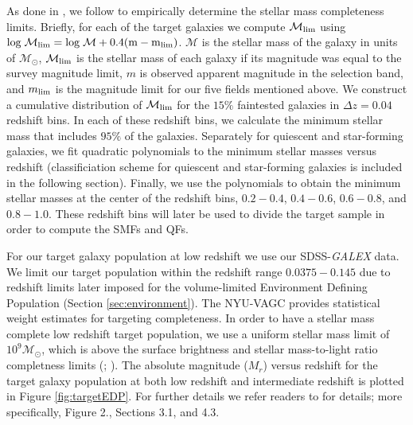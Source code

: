 \documentclass{emulateapj}
\begin{document}
As done in \cite{Moustakas:2013aa}, we follow \cite{Pozzetti:2010aa} to empirically determine the stellar mass completeness limits.
Briefly, for each of the target galaxies we compute $\mathcal{M}_{\rm{lim}}$ using $\rm{log} \; \mathcal{M}_{\rm{lim}} = \rm{log} \; \mathcal{M} + 0.4 ( m - m_{\rm{lim}})$.
$\mathcal{M}$ is the stellar mass of the galaxy in units of $\mathcal{M_{\odot}}$, $\mathcal{M}_{\rm{lim}}$ is the stellar mass of each galaxy if its magnitude was 
equal to the survey magnitude limit, $m$ is observed apparent magnitude in the selection band, and $m_{\rm{lim}}$ is the magnitude limit for our five fields mentioned above.
We construct a cumulative distribution of $\mathcal{M}_{\rm{lim}}$ for the $15\%$ faintested galaxies in $\Delta z=0.04$ redshift bins.
In each of these redshift bins, we calculate the minimum stellar mass that includes $95 \%$ of the galaxies.
Separately for quiescent and star-forming galaxies, we fit quadratic polynomials to the minimum stellar masses versus redshift (classificiation scheme for quiescent 
and star-forming galaxies is included in the following section).
Finally, we use the polynomials to obtain the minimum stellar masses at the center of the redshift bins, $0.2-0.4$, $0.4-0.6$, $0.6-0.8$, and $0.8-1.0$.
These redshift bins will later be used to divide the target sample in order to compute the SMFs and QFs.

For our target galaxy population at low redshift we use our SDSS-{\em GALEX} data. 
We limit our target population within the redshift range $0.0375-0.145$ due to redshift limits later imposed for the volume-limited Environment Defining Population (Section \ref{sec:environment}).
The NYU-VAGC provides statistical weight estimates for targeting completeness.
In order to have a stellar mass complete low redshift target population, we use a uniform stellar mass limit of $10^9 \mathcal{M}_{\odot}$, which is above the surface 
brightness and stellar mass-to-light ratio completness limits (\cite{Blanton:2005ab}; \cite{Baldry:2008aa}).
The absolute magnitude ($M_{r}$) versus redshift for the target galaxy population at both low redshift and intermediate redshift is plotted in Figure \ref{fig:targetEDP}.
For further details we refer readers to \cite{Moustakas:2013aa} for details; more specifically, Figure 2., Sections 3.1, and 4.3.
\end{document}
